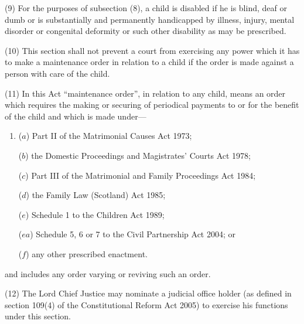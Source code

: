 \documentclass[12pt,a4paper]{article}
\begin{document}
(9) For the purposes of subsection (8), a child is disabled if he is blind, deaf or
dumb or is substantially and permanently handicapped by illness, injury, mental
disorder or congenital deformity or such other disability as may be prescribed.

(10) This section shall not prevent a court from exercising any power which it
has to make a maintenance order in relation to a child if the order is made against
a person with care of the child.

(11) In this Act “maintenance order”, in relation to any child, means an order
which requires the making or securing of periodical payments to or for the benefit
of the child and which is made under---
\begin{enumerate}\item[]
($a$)
Part II of the Matrimonial Causes Act 1973;

($b$)
the Domestic Proceedings and Magistrates’ Courts Act 1978;

($c$)
Part III of the Matrimonial and Family Proceedings Act 1984;

($d$)
the Family Law (Scotland) Act 1985;

($e$)
Schedule 1 to the Children Act 1989;

($ea$)
Schedule 5, 6 or 7 to the Civil Partnership Act 2004; or

($f$)
any other prescribed enactment.
\end{enumerate}
and includes any order varying or reviving such an order.

(12)
The Lord Chief Justice may nominate a judicial office holder (as defined in
section 109(4) of the Constitutional Reform Act 2005) to exercise his functions under
this section.
\end{document}
